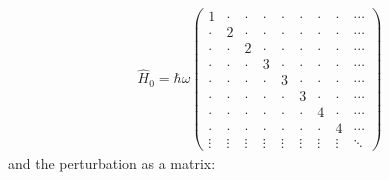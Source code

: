 \documentclass[10pt]{article}
\newcommand{\1}{\mathbf 1}
\begin{document}
\begin{align}
	\hat H_0
	=
	\hbar \omega
	\left(
		\begin{array}{ccccccccc}
		 1 & \cdot & \cdot & \cdot & \cdot & \cdot & \cdot & \cdot & \cdots \\
		 \cdot & 2 & \cdot & \cdot & \cdot & \cdot & \cdot & \cdot & \cdots \\
		 \cdot & \cdot & 2 & \cdot & \cdot & \cdot & \cdot & \cdot & \cdots \\
		 \cdot & \cdot & \cdot & 3 & \cdot & \cdot & \cdot & \cdot & \cdots \\
		 \cdot & \cdot & \cdot & \cdot & 3 & \cdot & \cdot & \cdot & \cdots \\
		 \cdot & \cdot & \cdot & \cdot & \cdot & 3 & \cdot & \cdot & \cdots \\
		 \cdot & \cdot & \cdot & \cdot & \cdot & \cdot & 4 & \cdot & \cdots \\
		 \cdot & \cdot & \cdot & \cdot & \cdot & \cdot & \cdot & 4 & \cdots \\
		 \vdots & \vdots & \vdots & \vdots & \vdots & \vdots & \vdots & \vdots & \ddots
		\end{array}
		\right)\label{unpertMat}
\end{align}
and the perturbation as a matrix:
\end{document}
